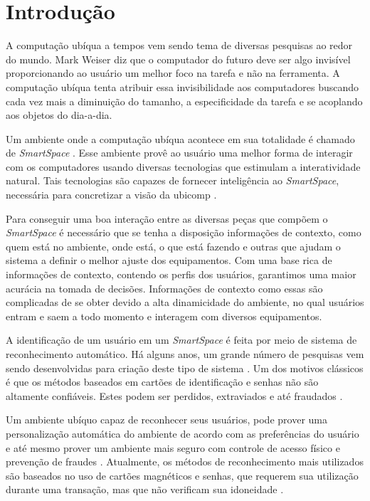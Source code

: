 
\chapter{Introdução}
	
A computação ubíqua a tempos vem sendo tema de diversas pesquisas ao redor do mundo. Mark Weiser diz que o computador do futuro deve ser algo invisível \cite{weiser1, weiser2} proporcionando ao usuário um melhor foco na tarefa e não na ferramenta. A computação ubíqua tenta atribuir essa invisibilidade aos computadores buscando cada vez mais a diminuição do tamanho, a especificidade da tarefa e se acoplando aos objetos do dia-a-dia.

Um ambiente onde a computação ubíqua acontece em sua totalidade é chamado de \textit{SmartSpace} \cite{gregoryabowd}. Esse ambiente provê ao usuário uma melhor forma de interagir com os computadores usando diversas tecnologias que estimulam a interatividade natural. Tais tecnologias são capazes de fornecer inteligência ao \textit{SmartSpace}, necessária para concretizar a visão da ubicomp \cite{fabriciobuzzeto}.

Para conseguir uma boa interação entre as diversas peças que compõem o \textit{SmartSpace} é necessário que se tenha a disposição informações de contexto,  como quem está no ambiente, onde está, o que está fazendo e outras que ajudam o sistema a definir o melhor ajuste dos equipamentos. Com uma base rica de informações de contexto, contendo os perfis dos usuários, garantimos uma maior acurácia na tomada de decisões. Informações de contexto como essas são complicadas de se obter devido a alta dinamicidade do ambiente, no qual usuários entram e saem a todo momento e interagem com diversos equipamentos.

A identificação de um usuário em um \textit{SmartSpace} é feita por meio de sistema de reconhecimento automático. Há alguns anos, um grande número de pesquisas vem sendo desenvolvidas para criação deste tipo de sistema  \cite{saocarlos}. Um dos motivos clássicos é que os métodos baseados em cartões de identificação e senhas não são altamente confiáveis. Estes podem ser perdidos, extraviados e até fraudados \cite{bolle}.

Um ambiente ubíquo capaz de reconhecer seus usuários, pode prover uma personalização automática do ambiente de acordo com as preferências do usuário e até mesmo prover um ambiente mais seguro com controle de acesso físico e prevenção de fraudes \cite{saocarlos}. Atualmente, os métodos de reconhecimento mais utilizados são baseados no uso de cartões magnéticos e senhas, que requerem sua utilização durante uma transação, mas que não verificam sua idoneidade \cite{daugman}.

